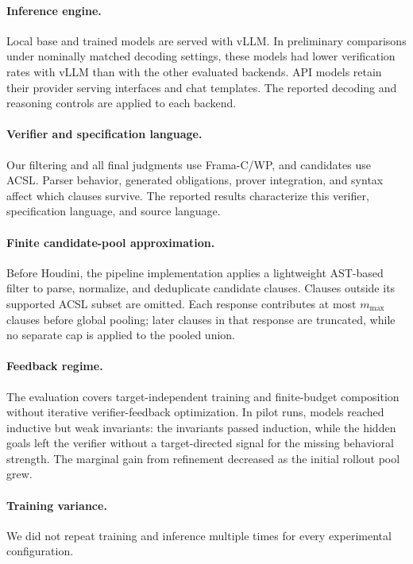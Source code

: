 \paragraph{Inference engine.}
Local base and trained models are served with vLLM.  In preliminary
comparisons under nominally matched decoding settings, these models had
lower verification rates with vLLM than with the other evaluated backends.
API models retain their provider serving interfaces and chat templates.  The
reported decoding and reasoning controls are applied to each backend.

\paragraph{Verifier and specification language.}
Our filtering and all final judgments use Frama-C/WP, and candidates use ACSL.
Parser behavior, generated obligations, prover integration, and syntax affect
which clauses survive.  The reported results characterize this verifier,
specification language, and source language.

\paragraph{Finite candidate-pool approximation.}
Before Houdini, the pipeline implementation applies a lightweight AST-based
filter to parse, normalize, and deduplicate candidate clauses.  Clauses outside
its supported ACSL subset are omitted.  Each response contributes at most
\(m_{\max}\) clauses before global pooling; later clauses in that response are
truncated, while no separate cap is applied to the pooled union.

\paragraph{Feedback regime.}
The evaluation covers target-independent training and finite-budget
composition without iterative verifier-feedback optimization.  In pilot runs,
models reached inductive but weak invariants: the invariants passed induction,
while the hidden goals left the verifier without a target-directed signal for
the missing behavioral strength.  The marginal gain from refinement decreased
as the initial rollout pool grew.

\paragraph{Training variance.}
We did not repeat training and inference multiple times for every experimental
configuration.
